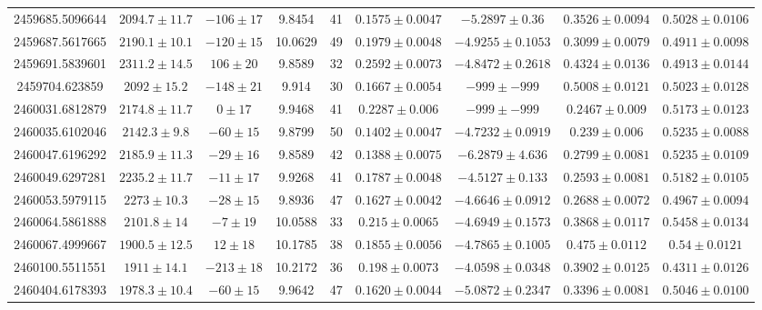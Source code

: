 \documentclass[twocolumn,twocolappendix]{aastex631}
\begin{document}
\begin{table}
\begin{rotatetable*}
\begin{center}
{\begin{tabular}{ccccccccc}
2459685.5096644 & $2094.7 \pm 11.7$ & $-106 \pm 17$ & 9.8454  & 41     & $0.1575 \pm 0.0047 $& $-5.2897 \pm 0.36   $&$ 0.3526 \pm 0.0094 $&$ 0.5028 \pm 0.0106 $\\
2459687.5617665 & $2190.1 \pm 10.1$ & $-120 \pm 15$ & 10.0629 & 49     & $0.1979 \pm 0.0048 $& $-4.9255 \pm 0.1053 $&$ 0.3099 \pm 0.0079 $&$ 0.4911 \pm 0.0098 $\\
2459691.5839601 & $2311.2 \pm 14.5$ & $106 \pm 20 $ & 9.8589  & 32     & $0.2592 \pm 0.0073 $& $-4.8472 \pm 0.2618 $&$ 0.4324 \pm 0.0136 $&$ 0.4913 \pm 0.0144 $\\
2459704.623859  & $2092 \pm 15.2$   & $-148 \pm 21$ & 9.914   & 30     & $0.1667 \pm 0.0054 $& $-999 \pm -999      $&$ 0.5008 \pm 0.0121 $&$ 0.5023 \pm 0.0128 $\\
2460031.6812879 & $2174.8 \pm 11.7$ & $0 \pm 17   $ & 9.9468  & 41     & $0.2287 \pm 0.006  $& $-999 \pm -999      $&$ 0.2467 \pm 0.009  $&$ 0.5173 \pm 0.0123 $\\
2460035.6102046 & $2142.3 \pm 9.8$  & $-60 \pm 15 $ & 9.8799  & 50     & $0.1402 \pm 0.0047 $& $-4.7232 \pm 0.0919 $&$ 0.239 \pm 0.006   $&$ 0.5235 \pm 0.0088 $\\
2460047.6196292 & $2185.9 \pm 11.3$ & $-29 \pm 16 $ & 9.8589  & 42     & $0.1388 \pm 0.0075 $& $-6.2879 \pm 4.636  $&$ 0.2799 \pm 0.0081 $&$ 0.5235 \pm 0.0109 $\\
2460049.6297281 & $2235.2 \pm 11.7$ & $-11 \pm 17 $ & 9.9268  & 41     & $0.1787 \pm 0.0048 $& $-4.5127 \pm 0.133  $&$ 0.2593 \pm 0.0081 $&$ 0.5182 \pm 0.0105 $\\
2460053.5979115 & $2273 \pm 10.3$   & $-28 \pm 15 $ & 9.8936  & 47     & $0.1627 \pm 0.0042 $& $-4.6646 \pm 0.0912 $&$ 0.2688 \pm 0.0072 $&$ 0.4967 \pm 0.0094 $\\
2460064.5861888 & $2101.8 \pm 14$   & $-7 \pm 19  $ & 10.0588 & 33     & $0.215 \pm 0.0065  $& $-4.6949 \pm 0.1573 $&$ 0.3868 \pm 0.0117 $&$ 0.5458 \pm 0.0134 $\\
2460067.4999667 & $1900.5 \pm 12.5$ & $12 \pm 18  $ & 10.1785 & 38     & $0.1855 \pm 0.0056 $& $-4.7865 \pm 0.1005 $&$ 0.475 \pm 0.0112  $&$ 0.54 \pm 0.0121  $ \\
2460100.5511551 & $1911 \pm 14.1$   & $-213 \pm 18$ & 10.2172 & 36     & $0.198 \pm 0.0073 $ & $-4.0598 \pm 0.0348 $&$ 0.3902 \pm 0.0125 $&$ 0.4311 \pm 0.0126$ \\ 
2460404.6178393 & $1978.3 \pm 10.4$ & $-60 \pm 15$  & 9.9642 & 47 & $0.1620 \pm 0.0044$ &  $-5.0872 \pm 0.2347$ & $0.3396 \pm 0.0081$ & $0.5046 \pm 0.0100$\\

\end{tabular}}
\end{center}
\end{rotatetable*}
\end{table}
\end{document}

